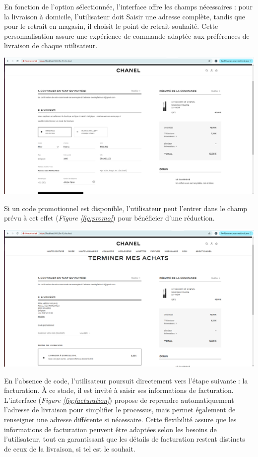 En fonction de l'option sélectionnée, l'interface offre les champs nécessaires : pour la livraison à domicile, l'utilisateur doit Saisir une adresse complète, tandis que pour le retrait en magasin, il choisit le point de retrait souhaité. Cette personnalisation assure une expérience de commande adaptée aux préférences de livraison de chaque utilisateur.
\begin{center}
    \centering
    \includegraphics[width=19cm]{Figures/Screens/Infos livraison.png}
    \label{fig:mode}
\end{center}
Si un code promotionnel est disponible, l'utilisateur peut l'entrer dans le champ prévu à cet effet (\textit{Figure \ref{fig:promo}}) pour bénéficier d'une réduction. 
\begin{center}
    \centering
    \includegraphics[width=19cm]{Figures/Screens/code prommo.png}
    \label{fig:promo}
\end{center}
En l'absence de code, l'utilisateur poursuit directement vers l'étape suivante : la facturation. À ce stade, il est invité à saisir ses informations de facturation. L'interface (\textit{Figure \ref{fig:facturation}}) propose de reprendre automatiquement l'adresse de livraison pour simplifier le processus, mais permet également de renseigner une adresse différente si nécessaire. Cette flexibilité assure que les informations de facturation peuvent être adaptées selon les besoins de l'utilisateur, tout en garantissant que les détails de facturation restent distincts de ceux de la livraison, si tel est le souhait.
